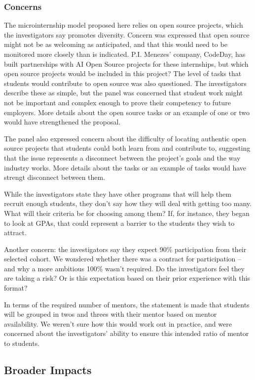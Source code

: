 \subsubsection{Concerns}

The microinternship model proposed here relies on open source projects, which the investigators say promotes diversity. Concern was expressed that open source might not be as welcoming as anticipated, and that this would need to be monitored more closely than is indicated. P.I. Menezes’ company, CodeDay, has built partnerships with AI Open Source projects for these internships, but which open source projects would be included in this project? The level of tasks that students would contribute to open source was also questioned. The investigators describe these as simple, but the panel was concerned that student work might not be important and complex enough to prove their competency to future employers. More details about the open source tasks or an example of one or two would have strengthened the proposal.

The panel also expressed concern about the difficulty of locating authentic open source projects that students could both learn from and contribute to, suggesting that the issue represents a disconnect between the project’s goals and the way industry works. More details about the tasks or an example of tasks would have strengt disconnect between them.

While the investigators state they have other programs that will help them recruit enough students, they don’t say how they will deal with getting too many. What will their criteria be for choosing among them? If, for instance, they began to look at GPAs, that could represent a barrier to the students they wish to attract.

Another concern: the investigators say they expect 90\% participation from their selected cohort. We wondered whether there was a contract for participation – and why a more ambitious 100\% wasn’t required. Do the investigators feel they are taking a risk? Or is this expectation based on their prior experience with this format?

In terms of the required number of mentors, the statement is made that students will be grouped in twos and threes with their mentor based on mentor availability. We weren’t sure how this would work out in practice, and were concerned about the investigators’ ability to ensure this intended ratio of mentor to students.

\subsection{Broader Impacts}

